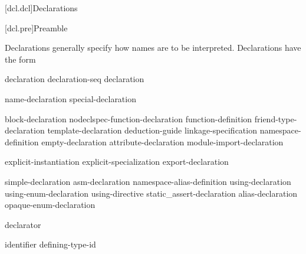 [dcl.dcl]{Declarations}%



[dcl.pre]{Preamble}

\pnum
Declarations generally specify how names are to be interpreted. Declarations have
the form
\begin{bnf}
\br
    declaration\br
    declaration-seq declaration
\end{bnf}

\begin{bnf}
\br
    name-declaration\br
    special-declaration
\end{bnf}

\begin{bnf}
\br
    block-declaration\br
    nodeclspec-function-declaration\br
    function-definition\br
    friend-type-declaration\br
    template-declaration\br
    deduction-guide\br
    linkage-specification\br
    namespace-definition\br
    empty-declaration\br
    attribute-declaration\br
    module-import-declaration
\end{bnf}

\begin{bnf}
\br
    explicit-instantiation\br
    explicit-specialization\br
    export-declaration
\end{bnf}

\begin{bnf}
\br
    simple-declaration\br
    asm-declaration\br
    namespace-alias-definition\br
    using-declaration\br
    using-enum-declaration\br
    using-directive\br
    static_assert-declaration\br
    alias-declaration\br
    opaque-enum-declaration
\end{bnf}

\begin{bnf}
\br
     declarator \terminal{;}
\end{bnf}

\begin{bnf}
\br
     identifier  \terminal{=} defining-type-id \terminal{;}
\end{bnf}


